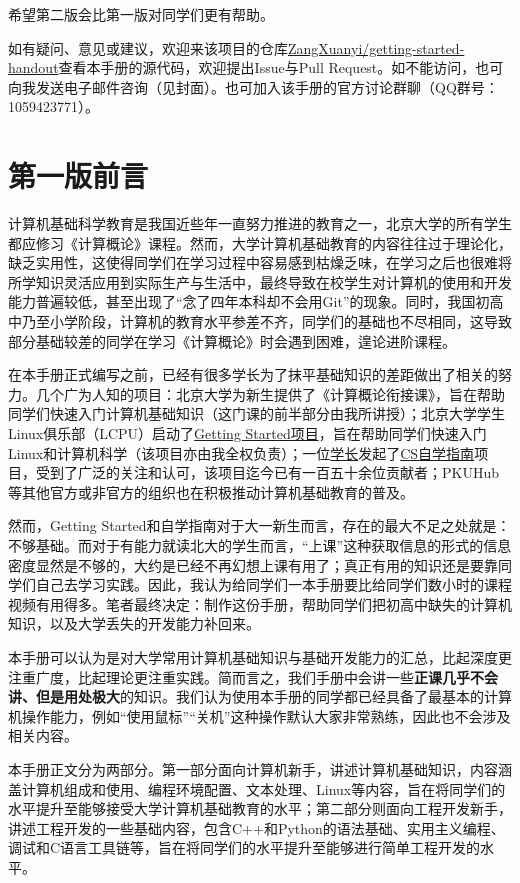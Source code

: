 希望第二版会比第一版对同学们更有帮助。

如有疑问、意见或建议，欢迎来该项目的仓库\faGithub\href{https://github.com/ZangXuanyi/getting-started-handout}{ZangXuanyi/getting-started-handout}查看本手册的源代码，欢迎提出Issue与Pull Request。如不能访问，也可向我发送电子邮件咨询（见封面）。也可加入该手册的官方讨论群聊（QQ群号：1059423771）。


\chapter{第一版前言}

计算机基础科学教育是我国近些年一直努力推进的教育之一，北京大学的所有学生都应修习《计算概论》课程。然而，大学计算机基础教育的内容往往过于理论化，缺乏实用性，这使得同学们在学习过程中容易感到枯燥乏味，在学习之后也很难将所学知识灵活应用到实际生产与生活中，最终导致在校学生对计算机的使用和开发能力普遍较低，甚至出现了“念了四年本科却不会用Git”的现象。同时，我国初高中乃至小学阶段，计算机的教育水平参差不齐，同学们的基础也不尽相同，这导致部分基础较差的同学在学习《计算概论》时会遇到困难，遑论进阶课程。

在本手册正式编写之前，已经有很多学长为了抹平基础知识的差距做出了相关的努力。几个广为人知的项目：北京大学为新生提供了《计算概论衔接课》，旨在帮助同学们快速入门计算机基础知识（这门课的前半部分由我所讲授）；北京大学学生Linux俱乐部（LCPU）启动了\href{missing.lcpu.dev}{Getting Started项目}，旨在帮助同学们快速入门Linux和计算机科学（该项目亦由我全权负责）；一位\faGithub\href{https://github.com/PKUFlyingPig}{学长}发起了\href{https://csdiy.wiki/}{CS自学指南}项目，受到了广泛的关注和认可，该项目迄今已有一百五十余位贡献者；PKUHub等其他官方或非官方的组织也在积极推动计算机基础教育的普及。

然而，Getting Started和自学指南对于大一新生而言，存在的最大不足之处就是：不够基础。而对于有能力就读北大的学生而言，“上课”这种获取信息的形式的信息密度显然是不够的，大约是已经不再幻想上课有用了；真正有用的知识还是要靠同学们自己去学习实践。因此，我认为给同学们一本手册要比给同学们数小时的课程视频有用得多。笔者最终决定：制作这份手册，帮助同学们把初高中缺失的计算机知识，以及大学丢失的开发能力补回来。

本手册可以认为是对大学常用计算机基础知识与基础开发能力的汇总，比起深度更注重广度，比起理论更注重实践。简而言之，我们手册中会讲一些\textbf{正课几乎不会讲、但是用处极大}的知识。我们认为使用本手册的同学都已经具备了最基本的计算机操作能力，例如“使用鼠标”“关机”这种操作默认大家非常熟练，因此也不会涉及相关内容。

本手册正文分为两部分。第一部分面向计算机新手，讲述计算机基础知识，内容涵盖计算机组成和使用、编程环境配置、文本处理、Linux等内容，旨在将同学们的水平提升至能够接受大学计算机基础教育的水平；第二部分则面向工程开发新手，讲述工程开发的一些基础内容，包含C++和Python的语法基础、实用主义编程、调试和C语言工具链等，旨在将同学们的水平提升至能够进行简单工程开发的水平。

